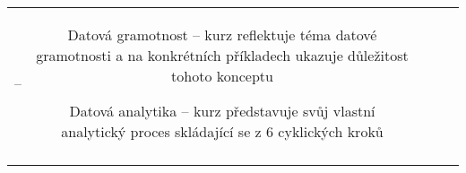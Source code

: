\begin{landscape}
\begin{table}[htbp]
{\begin{tabularx}{\linewidth}{CCCCC}
–

&

Datová gramotnost – kurz reflektuje téma datové gramotnosti a na konkrétních příkladech ukazuje důležitost tohoto konceptu

Datová analytika – kurz představuje svůj vlastní analytický proces skládající se z 6 cyklických kroků

\\

\tabularnewline
\bottomrule
\end{tabularx}

}

\end{table}

\end{landscape}